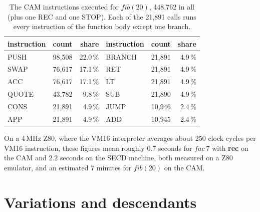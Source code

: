\documentclass[11pt,a4paper]{article}
\newcommand{\ins}[1]{\textsf{#1}}
\theoremstyle{definition}
\theoremstyle{plain}
\begin{document}
\begin{table}[t]
\centering
\small
\begin{tabular}{@{}l r r @{\qquad} l r r@{}}
\toprule
instruction & count & share & instruction & count & share\\
\midrule
\ins{PUSH}  & 98,508 & 22.0\,\% & \ins{BRANCH} & 21,891 & 4.9\,\%\\
\ins{SWAP}  & 76,617 & 17.1\,\% & \ins{RET}    & 21,891 & 4.9\,\%\\
\ins{ACC}   & 76,617 & 17.1\,\% & \ins{LT}     & 21,891 & 4.9\,\%\\
\ins{QUOTE} & 43,782 &  9.8\,\% & \ins{SUB}    & 21,890 & 4.9\,\%\\
\ins{CONS}  & 21,891 &  4.9\,\% & \ins{JUMP}   & 10,946 & 2.4\,\%\\
\ins{APP}   & 21,891 &  4.9\,\% & \ins{ADD}    & 10,945 & 2.4\,\%\\
\bottomrule
\end{tabular}
\caption{The CAM instructions executed for $\mathit{fib}(20)$, 448,762 in all
(plus one \ins{REC} and one \ins{STOP}). Each of the 21,891 calls runs every
instruction of the function body except one branch.}
\label{tab:mix}
\end{table}

On a 4\,MHz Z80, where the VM16 interpreter averages about 250 clock cycles
per VM16 instruction, these figures mean roughly 0.7 seconds for
$\mathit{fac}\ 7$ with \textbf{rec} on the CAM and 2.2 seconds on the SECD
machine, both measured on a Z80 emulator, and an estimated 7 minutes for
$\mathit{fib}(20)$ on the CAM.

\section{Variations and descendants}\label{sec:descendants}
\end{document}
